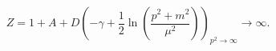 \begin{equation}
Z=1+A+D(-\gamma+\frac{1}{2}\ln(\frac{p^{2}+m^{2}}{\mu^{2}}))_{p^{2}%
\rightarrow\infty}\rightarrow\infty.
\end{equation}


